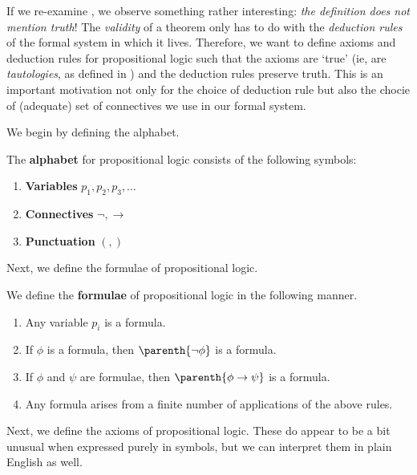 If we re-examine , we observe something rather interesting: \textit{the definition does not mention truth}! The \textit{validity} of a theorem only has to do with the \textit{deduction rules} of the formal system in which it lives. Therefore, we want to define axioms and deduction rules for propositional logic such that the axioms are `true' (ie, are \textit{tautologies}, as defined in ) and the deduction rules preserve truth. This is an important motivation not only for the choice of deduction rule but also the chocie of (adequate) set of connectives we use in our formal system.

We begin by defining the alphabet.

\begin{boxdefinition}\label{Ch1:Def:FormalPropAlphabet}
    The \textbf{alphabet} for propositional logic consists of the following symbols:
    \begin{enumerate}
        \item \textbf{Variables} $p_1, p_2, p_3, \ldots$
        \item \textbf{Connectives} $\neg, \to$
        \item \textbf{Punctuation} $(, )$
    \end{enumerate}
\end{boxdefinition}

Next, we define the formulae of propositional logic.

\begin{boxdefinition}\label{Ch1:Def:FormalPropFormulae}
    We define the \textbf{formulae} of propositional logic in the following manner.
    \begin{enumerate}
        \item Any variable $p_i$ is a formula.
        \item If $\phi$ is a formula, then $\parenth{\neg \phi}$ is a formula.
        \item If $\phi$ and $\psi$ are formulae, then $\parenth{\phi \to \psi}$ is a formula.
        \item Any formula arises from a finite number of applications of the above rules.
    \end{enumerate}
\end{boxdefinition}

Next, we define the axioms of propositional logic. These do appear to be a bit unusual when expressed purely in symbols, but we can interpret them in plain English as well.

